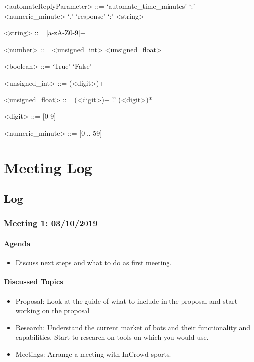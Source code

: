 \begin{appendices}
\begin{grammar}
<automateReplyParameter> ::= `automate_time_minutes' `:' <numeric_minute> `,' `response' `:' <string>

<string> ::= [a-zA-Z0-9]+

<number> ::= <unsigned_int>
\alt <unsigned_float>

<boolean> ::= `True'
\alt `False'

<unsigned_int> ::= (<digit>)+

<unsigned_float> ::= (<digit>)+ '.' (<digit>)*

<digit> ::= [0-9]

<numeric_minute> ::= [0 .. 59]
\end{grammar}

\chapter{Meeting Log}

\section{Log}

\subsection{Meeting 1: 03/10/2019}

\subsubsection{Agenda}

\begin{itemize}
 \item Discuss next steps and what to do as first meeting.
\end{itemize}

\subsubsection{Discussed Topics}

\begin{itemize}

 \item Proposal: Look at the guide of what to include in the proposal and start working on the proposal
 \item Research: Understand the current market of bots and their functionality and capabilities. Start to research on tools on which you would use.
 \item Meetings: Arrange a meeting with InCrowd sports.
\end{itemize}


\end{appendices}

